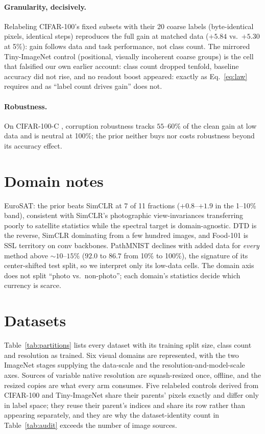 \paragraph{Granularity, decisively.} Relabeling CIFAR-100's fixed
subsets with their 20 coarse labels (byte-identical pixels, identical
steps) reproduces the full gain at matched data ($+5.84$ vs.\ $+5.30$ at
5\%): gain follows data and task performance, not class count. The
mirrored Tiny-ImageNet control (positional, visually incoherent coarse
groups) is the cell that falsified our own earlier account: class count
dropped tenfold, baseline accuracy did not rise, and no readout boost
appeared: exactly as Eq.~\ref{eq:law} requires and as ``label count
drives gain'' does not.

\paragraph{Robustness.} On CIFAR-100-C \citep{hendrycks2019benchmarking},
corruption robustness tracks $55$--$60\%$ of the clean gain at low data
and is neutral at 100\%; the prior neither buys nor costs robustness
beyond its accuracy effect.

\section{Domain notes}\label{app:domains}

EuroSAT: the prior beats SimCLR at 7 of 11 fractions ($+0.8$--$+1.9$ in the
1--10\% band), consistent with SimCLR's photographic view-invariances
transferring poorly to satellite statistics while the spectral target is
domain-agnostic. DTD is the reverse, SimCLR dominating from a few hundred
images, and Food-101 is SSL territory on conv backbones. PathMNIST declines
with added data for \emph{every} method above ${\sim}10$--$15\%$ ($92.0$ to
$86.7$ from 10\% to 100\%), the signature of its center-shifted test split, so
we interpret only its low-data cells. The domain axis does not split ``photo
vs.\ non-photo''; each domain's statistics decide which currency is scarce.

\section{Datasets}\label{app:datasets}

Table~\ref{tab:partitions} lists every dataset with its training split size,
class count and resolution as trained. Six visual domains are represented,
with the two ImageNet stages supplying the data-scale and the
resolution-and-model-scale axes. Sources of variable native resolution are
squash-resized once, offline, and the resized copies are what every arm
consumes. Five relabeled controls derived from CIFAR-100 and Tiny-ImageNet
share their parents' pixels exactly and differ only in label space; they reuse
their parent's indices and share its row rather than appearing separately, and
they are why the dataset-identity count in Table~\ref{tab:audit} exceeds the
number of image sources.

